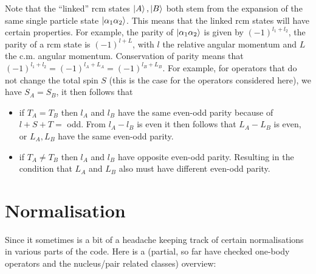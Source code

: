 \documentclass[10pt]{article}
\begin{document}
Note that the ``linked'' rcm states $\ket{A},\ket{B}$ both stem from the 
expansion of the same single particle state $\ket{ \alpha_1 \alpha_2}$.
This means that the linked rcm states will have certain properties.
For example, the parity of $\ket{ \alpha_1 \alpha_2}$ is given by $(-1)^{l_1 + l_2}$, the parity of a rcm state is $(-1)^{l+L}$, with $l$ the relative angular momentum and $L$ the c.m. angular momentum.
Conservation of parity means that $(-1)^{l_1 + l_2} = (-1)^{l_A + L_A} = (-1)^{l_B + L_B}$.
For example, for operators that do not change the total spin $S$ (this is the case for the operators considered here), we have $S_A = S_B$, it then follows that
\begin{itemize}
	\item if $T_A=T_B$ then $l_A$ and $l_B$ have the same even-odd parity because of $l+S+T=$ odd.
	From $l_A - l_B$ is even it then follows that $L_A - L_B$ is even, or $L_A,L_B$ have the same even-odd parity.
	\item if $T_A \neq T_B$ then $l_A$ and $l_B$ have opposite even-odd parity. Resulting in the condition that $L_A$ and $L_B$ also must have different even-odd parity. 
\end{itemize}
\section{Normalisation}
Since it sometimes is a bit of a headache keeping track of certain 
normalisations in various parts of the code.  Here is a (partial, so far have 
checked one-body operators and the nucleus/pair related classes) overview:
\end{document}
